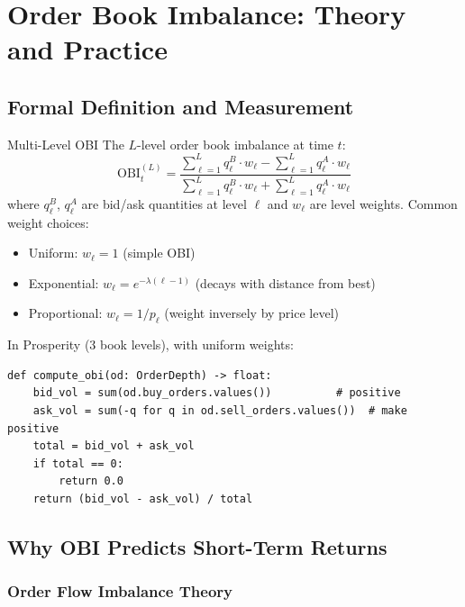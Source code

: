 \documentclass[12pt,a4paper,openany]{report}
\theoremstyle{definition}
\begin{document}

\chapter{Order Book Imbalance: Theory and Practice}

\section{Formal Definition and Measurement}

\begin{definitionbox}{Multi-Level OBI}
The $L$-level order book imbalance at time $t$:
\[
  \text{OBI}_t^{(L)} = \frac{\sum_{\ell=1}^L q_\ell^B \cdot w_\ell - \sum_{\ell=1}^L q_\ell^A \cdot w_\ell}{\sum_{\ell=1}^L q_\ell^B \cdot w_\ell + \sum_{\ell=1}^L q_\ell^A \cdot w_\ell}
\]
where $q_\ell^B$, $q_\ell^A$ are bid/ask quantities at level $\ell$ and $w_\ell$ are level weights. Common weight choices:
\begin{itemize}
  \item Uniform: $w_\ell = 1$ (simple OBI)
  \item Exponential: $w_\ell = e^{-\lambda(\ell-1)}$ (decays with distance from best)
  \item Proportional: $w_\ell = 1/p_\ell$ (weight inversely by price level)
\end{itemize}
\end{definitionbox}

In Prosperity (3 book levels), with uniform weights:
\begin{lstlisting}[caption={OBI computation from OrderDepth}]
def compute_obi(od: OrderDepth) -> float:
    bid_vol = sum(od.buy_orders.values())          # positive
    ask_vol = sum(-q for q in od.sell_orders.values())  # make positive
    total = bid_vol + ask_vol
    if total == 0:
        return 0.0
    return (bid_vol - ask_vol) / total
\end{lstlisting}

\section{Why OBI Predicts Short-Term Returns}

\subsection{Order Flow Imbalance Theory}
\end{document}
